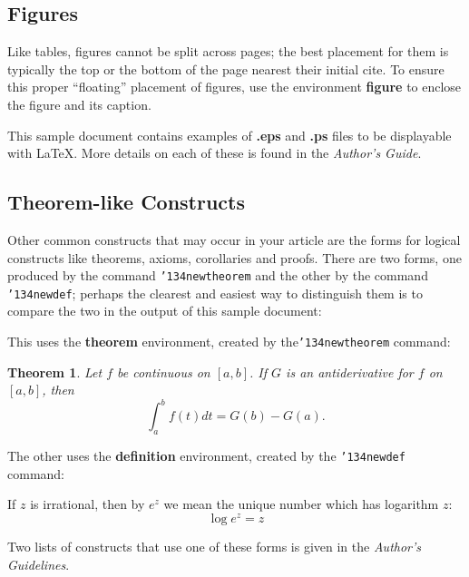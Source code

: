 \documentclass{sig-alternate}
\begin{document}
\subsection{Figures}
Like tables, figures cannot be split across pages; the
best placement for them
is typically the top or the bottom of the page nearest
their initial cite.  To ensure this proper ``floating'' placement
of figures, use the environment
\textbf{figure} to enclose the figure and its caption.

This sample document contains examples of \textbf{.eps}
and \textbf{.ps} files to be displayable with \LaTeX.  More
details on each of these is found in the \textit{Author's Guide}.

\subsection{Theorem-like Constructs}
Other common constructs that may occur in your article are
the forms for logical constructs like theorems, axioms,
corollaries and proofs.  There are
two forms, one produced by the
command \texttt{{\char'134}newtheorem} and the
other by the command \texttt{{\char'134}newdef}; perhaps
the clearest and easiest way to distinguish them is
to compare the two in the output of this sample document:

This uses the \textbf{theorem} environment, created by
the\linebreak\texttt{{\char'134}newtheorem} command:
\newtheorem{theorem}{Theorem}
\begin{theorem}
Let $f$ be continuous on $[a,b]$.  If $G$ is
an antiderivative for $f$ on $[a,b]$, then
\begin{displaymath}\int^b_af(t)dt = G(b) - G(a).\end{displaymath}
\end{theorem}

The other uses the \textbf{definition} environment, created
by the \texttt{{\char'134}newdef} command:
\begin{definition}
If $z$ is irrational, then by $e^z$ we mean the
unique number which has
logarithm $z$: \begin{displaymath}{\log e^z = z}\end{displaymath}
\end{definition}

Two lists of constructs that use one of these
forms is given in the
\textit{Author's  Guidelines}.
 
\end{document}

